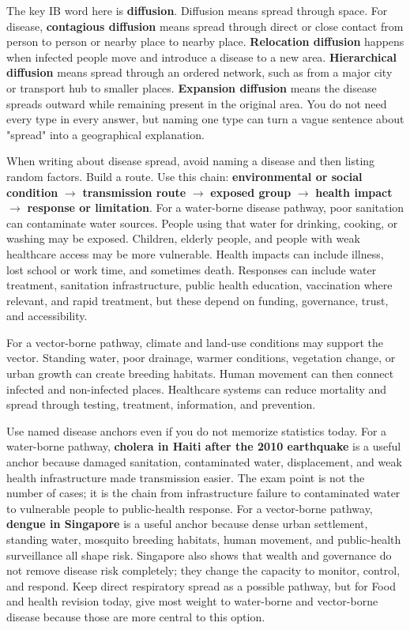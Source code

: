\documentclass[11pt,a4paper]{article}
\newcommand{\term}[1]{\textcolor{HeadingBlue}{\textbf{#1}}}
\begin{document}
The key IB word here is \term{diffusion}. Diffusion means spread through space.
For disease, \term{contagious diffusion} means spread through direct or close
contact from person to person or nearby place to nearby place. \term{Relocation
diffusion} happens when infected people move and introduce a disease to a new
area. \term{Hierarchical diffusion} means spread through an ordered network,
such as from a major city or transport hub to smaller places. \term{Expansion
diffusion} means the disease spreads outward while remaining present in the
original area. You do not need every type in every answer, but naming one type
can turn a vague sentence about "spread" into a geographical explanation.

When writing about disease spread, avoid naming a disease and then listing
random factors. Build a route. Use this chain:
\term{environmental or social condition} $\rightarrow$ \term{transmission
route} $\rightarrow$ \term{exposed group} $\rightarrow$ \term{health impact}
$\rightarrow$ \term{response or limitation}. For a water-borne disease pathway,
poor sanitation can contaminate water sources. People using that water for
drinking, cooking, or washing may be exposed. Children, elderly people, and
people with weak healthcare access may be more vulnerable. Health impacts can
include illness, lost school or work time, and sometimes death. Responses can
include water treatment, sanitation infrastructure, public health education,
vaccination where relevant, and rapid treatment, but these depend on funding,
governance, trust, and accessibility.

For a vector-borne pathway, climate and land-use conditions may support the
vector. Standing water, poor drainage, warmer conditions, vegetation change, or
urban growth can create breeding habitats. Human movement can then connect
infected and non-infected places. Healthcare systems can reduce mortality and
spread through testing, treatment, information, and prevention.

Use named disease anchors even if you do not memorize statistics today. For a
water-borne pathway, \term{cholera in Haiti after the 2010 earthquake} is a
useful anchor because damaged sanitation, contaminated water, displacement, and
weak health infrastructure made transmission easier. The exam point is not the
number of cases; it is the chain from infrastructure failure to contaminated
water to vulnerable people to public-health response. For a vector-borne
pathway, \term{dengue in Singapore} is a useful anchor because dense urban
settlement, standing water, mosquito breeding habitats, human movement, and
public-health surveillance all shape risk. Singapore also shows that wealth and
governance do not remove disease risk completely; they change the capacity to
monitor, control, and respond. Keep direct respiratory spread as a possible
pathway, but for Food and health revision today, give most weight to water-borne
and vector-borne disease because those are more central to this option.
\end{document}
